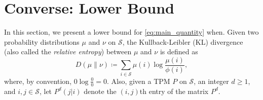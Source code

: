 \section{Converse: Lower Bound}\label{sec:lower_bound}
In this section, we present a lower bound for \eqref{eq:main_quantity} when. Given two probability distributions $\mu$ and $\nu$ on $\mathcal{S}$, the Kullback-Leibler (KL) divergence (also called the {\em relative entropy}) between $\mu$ and $\nu$ is defined as
\begin{equation}
	D(\mu\|\nu)\coloneqq \sum\limits_{i\in\mathcal{S}}\mu(i)\log \frac{\mu(i)}{\phi(i)},\label{eq:D(mu||nu)}
\end{equation}
where, by convention, $0\log \frac{0}{0}=0$. Also, given a TPM $P$ on $\mathcal{S}$, an integer $d\geq 1$, and $i, j\in \mathcal{S}$, let $P^d(j|i)$ denote the $(i, j)$th entry of the matrix $P^d$.

